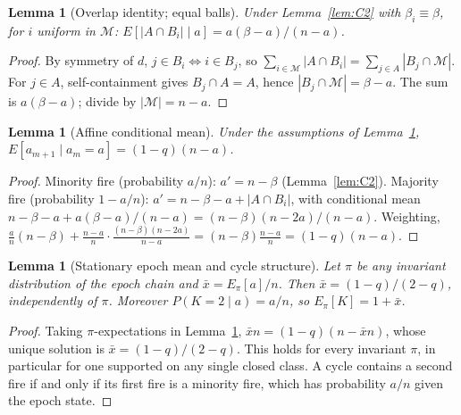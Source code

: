 \documentclass[pdflatex,sn-mathphys-num]{sn-jnl}
\theoremstyle{thmstyleone}%
\newtheorem{lemma}[theorem]{Lemma}
\theoremstyle{thmstylethree}%
\theoremstyle{thmstyletwo}%
\begin{document}
\begin{lemma}[Overlap identity; equal balls]
\label{lem:C3}
Under Lemma~\ref{lem:C2} with $\beta_i\equiv\beta$, for $i$ uniform in
$\mathcal M$: $E[|A\cap B_i|\mid a]=a(\beta-a)/(n-a)$.
\end{lemma}
\begin{proof}
By symmetry of $d$, $j\in B_i\iff i\in B_j$, so
$\sum_{i\in\mathcal M}|A\cap B_i|=\sum_{j\in A}|B_j\cap\mathcal M|$. For
$j\in A$, self-containment gives $B_j\cap A=A$, hence
$|B_j\cap\mathcal M|=\beta-a$. The sum is $a(\beta-a)$; divide by
$|\mathcal M|=n-a$.
\end{proof}

\begin{lemma}[Affine conditional mean]
\label{lem:C4}
Under the assumptions of Lemma~\ref{lem:C3},
$E[a_{m+1}\mid a_m=a]=(1-q)(n-a)$.
\end{lemma}
\begin{proof}
Minority fire (probability $a/n$): $a'=n-\beta$ (Lemma~\ref{lem:C2}).
Majority fire (probability $1-a/n$): $a'=n-\beta-a+|A\cap B_i|$, with
conditional mean $n-\beta-a+a(\beta-a)/(n-a)=(n-\beta)(n-2a)/(n-a)$.
Weighting,
$\frac{a}{n}(n-\beta)+\frac{n-a}{n}\cdot\frac{(n-\beta)(n-2a)}{n-a}
=(n-\beta)\frac{n-a}{n}=(1-q)(n-a)$.
\end{proof}

\begin{lemma}[Stationary epoch mean and cycle structure]
\label{lem:C5}
Let $\pi$ be any invariant distribution of the epoch chain and
$\bar x=E_\pi[a]/n$. Then $\bar x=(1-q)/(2-q)$, independently of $\pi$.
Moreover $P(K=2\mid a)=a/n$, so $E_\pi[K]=1+\bar x$.
\end{lemma}
\begin{proof}
Taking $\pi$-expectations in Lemma~\ref{lem:C4},
$\bar xn=(1-q)(n-\bar xn)$, whose unique solution is
$\bar x=(1-q)/(2-q)$. This holds for every invariant $\pi$, in particular
for one supported on any single closed class. A cycle contains a second
fire if and only if its first fire is a minority fire, which has
probability $a/n$ given the epoch state.
\end{proof}
\end{document}
